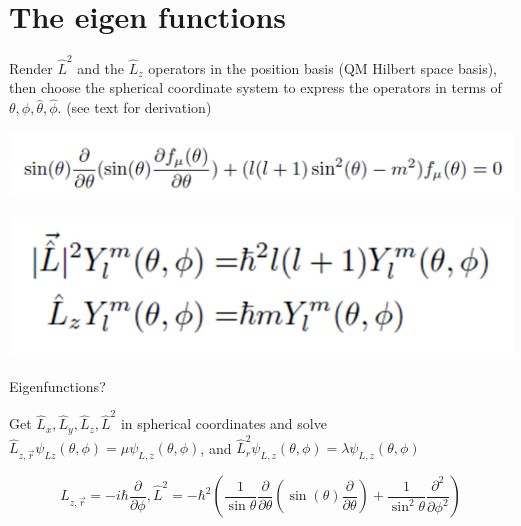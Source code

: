 \documentclass{article}
\begin{document}
\section{The eigen functions}

Render  $\hat{L}^2$ and the $\hat{L}_z$ operators in the position basis (QM Hilbert space basis), then choose the spherical coordinate system to express the operators in terms of  $\theta, \phi, \hat{\theta}, \hat{\phi}$. (see text for derivation)   

\includegraphics[width = 0.45 \textwidth]{Lecture22/4.png}


\includegraphics[width = 0.3 \textwidth]{Lecture22/5.png}

Eigenfunctions?

Get $\hat{L}_x, \hat{L}_y, \hat{L}_z, \hat{L}^2$ in spherical coordinates and solve $\hat{L}_{z, \vec r} \psi_{Lz}(\theta,\phi) = \mu \psi_{L,z} (\theta, \phi)$, and  $\hat{L}_r^2 \psi_{L,z} (\theta,\phi) = \lambda \psi_{L,z} (\theta, \phi)$

$$L_{z,\vec{r}} = - i \hbar \frac{\partial}{\partial \phi}, \hat{L}^2 = - \hbar^2 \left( \frac{1}{\sin{\theta}} \frac{\partial}{\partial \theta} \left( \sin(\theta) \frac{\partial}{\partial \theta} \right) + \frac{1}{\sin^2 \theta} \frac{\partial^2}{\partial \phi^2} \right)$$

\end{document}
